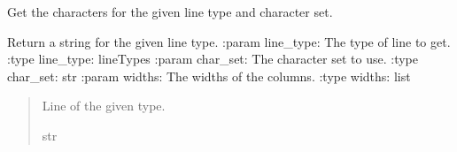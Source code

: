 \documentclass[letterpaper,10pt,english]{sphinxmanual}
\begin{document}
\begin{fulllineitems}
\begin{fulllineitems}
\label{\detokenize{nodes:nodes.nodePrinter.tablePrinter.get_line_chars}}
\pysigstartsignatures
\pysiglinewithargsret
{}
{\sphinxparamcomma {}}
{}
\pysigstopsignatures
\sphinxAtStartPar
Get the characters for the given line type and character set.

\end{fulllineitems}


\begin{fulllineitems}
\label{\detokenize{nodes:nodes.nodePrinter.tablePrinter.get_line_no_data}}
\pysigstartsignatures
\pysiglinewithargsret
{}
{\sphinxparamcomma {}\sphinxparamcomma {}}
{}
\pysigstopsignatures
\sphinxAtStartPar
Return a string for the given line type.
:param line\_type: The type of line to get.
:type line\_type: lineTypes
:param char\_set: The character set to use.
:type char\_set: str
:param widths: The widths of the columns.
:type widths: list
\begin{quote}\begin{description}
\sphinxAtStartPar
Line of the given type.

\sphinxAtStartPar
str

\end{description}\end{quote}

\end{fulllineitems}



\end{fulllineitems}
\end{document}
